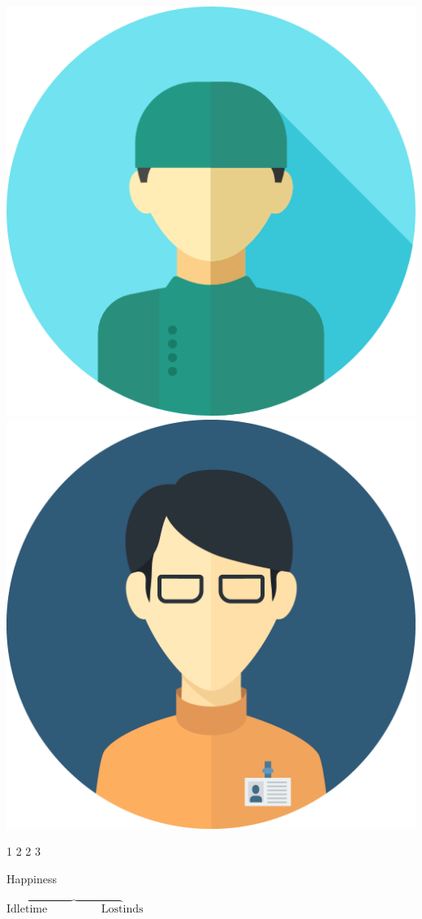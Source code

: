 \begin{frame}
    \hspace{0.4cm}
    \includegraphics[scale=0.1]{Bin/staff_avatars/doctor_2.png}
    \hspace{0.4cm}
    \includegraphics[scale=0.04]{Bin/staff_avatars/doctor_3.png}

    \LARGE
    \vspace{0.5cm}
    1 \hspace{1.4cm} 2 \hspace{1.5cm} 2 \hspace{1.5cm} 3

    \pause
    \vspace{1.5cm}
    Happiness

    \small
    \(\text{Idle} \overbrace{\text{time} \hspace{2cm} \text{Lost}} \text{inds}\)
\end{frame}



